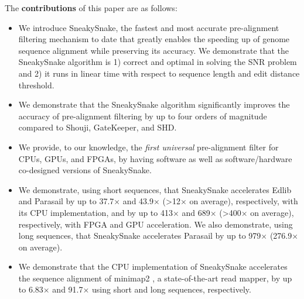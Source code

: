 The \textbf{contributions} of this paper are as follows: 
\begin{itemize}
\item We introduce SneakySnake, 
the fastest and most accurate pre-alignment filtering mechanism to date that greatly enables the speeding up of genome sequence alignment while preserving its accuracy. We demonstrate that the SneakySnake algorithm is 1) correct and optimal in solving the SNR problem and 2) it runs in linear time with respect to sequence length and edit distance threshold.
\item We demonstrate that the SneakySnake algorithm significantly improves the accuracy of pre-alignment filtering by up to four orders of magnitude compared to Shouji, GateKeeper, and SHD.
\item We provide, to our knowledge, the \emph{first universal} pre-alignment filter for {CPUs, GPUs, and FPGAs}, by having software as well as software/hardware co-designed versions {of SneakySnake}.
\item We demonstrate, using short sequences, that SneakySnake accelerates Edlib and Parasail by up to 37.7$\times$ and 43.9$\times$ (>12$\times$ on average), respectively, {with} its CPU implementation, and by up to 413$\times$ and 689$\times$ (>400$\times$ on average), respectively, {with} {FPGA and GPU} acceleration. 
{We also demonstrate, using long sequences, that SneakySnake accelerates Parasail by up to 979$\times$ (276.9$\times$ on average).}
\item We demonstrate that {the CPU implementation of} SneakySnake accelerates the sequence alignment of minimap2 \citep{li2018minimap2}, a state-of-the-art read mapper, {by up to 6.83$\times$ and  91.7$\times$ using short and long sequences, respectively}.
\end{itemize}
